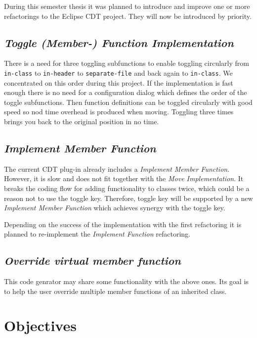 During this semester thesis it was planned to introduce and improve one or more
refactorings to the Eclipse CDT project. They will now be introduced by 
priority.

\subsection{\textit{Toggle (Member-) Function Implementation}}
There is a need for three toggling subfunctions to enable toggling circularly
from \texttt{in-class}
to \texttt{in-header} to \texttt{separate-file}  and back again to
\texttt{in-class}. We concentrated on this order during this project. If the
implementation is fast enough there is no need for a configuration dialog which
defines the order of the toggle subfunctions.
Then function definitions can be toggled circularly with good speed so nod time
overhead is produced when moving. Toggling three times brings you back to the
original position in no time. 

\subsection{\textit{Implement Member Function}}
The current CDT plug-in already includes a \textit{Implement Member Function}.
However, it is slow and does not fit together with the \textit{Move
Implementation}. It breaks the coding flow for adding functionality to classes
twice, which could be a reason not to use the toggle key. Therefore, toggle key
will be supported by a new \textit{Implement Member Function} which achieves
synergy with the toggle key.

Depending on the success of the implementation with the first refactoring it is 
planned to re-implement the \textit{Implement Function} refactoring.

\subsection{\textit{Override virtual member function}}
This code genrator may share some functionality with the above ones. Its goal is 
to help the user override multiple member functions of an inherited class.

\section{Objectives}

